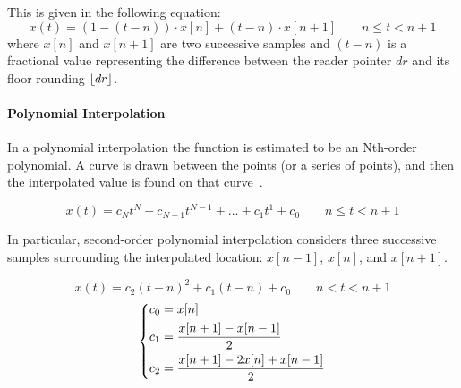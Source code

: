 This is given in the following equation:
\[
	x(t) = (1 - (t - n)) \cdot x[n] + (t-n) \cdot x[n+1] \qquad n \leq t < n + 1
\]
where $x[n]$ and $x[n+1]$ are two successive samples and $(t-n)$ is a fractional value representing the difference between the reader pointer $dr$ and its floor rounding $\lfloor dr\rfloor$.

\paragraph{Polynomial Interpolation}
In a polynomial interpolation the function is estimated to be an Nth-order polynomial. A curve is drawn between the points (or a series of points), and then the interpolated value is found on that curve~\cite{pirkle2013designing}.

\[
	x(t) = c_{N}t^{N} + c_{N-1}t^{N-1} + \dots + c_{1}t^{1} + c_{0} \qquad n \leq t< n + 1
\]

In particular, second-order polynomial interpolation considers three successive samples surrounding the interpolated location: $x[n-1]$, $x[n]$, and $x[n+1]$. 

\[
	x(t) = c_{2}(t-n)^{2} + c_{1}(t-n) + c_{0} \qquad n < t < n + 1
\]
\[
	\begin{dcases}
		c_{0} = x[n] \\
		c_{1} = \frac{x[n+1] - x[n-1]}{2} \\
		c_{2} = \frac{x[n+1] - 2 x[n] + x[n-1]}{2} 
	\end{dcases}
\]


